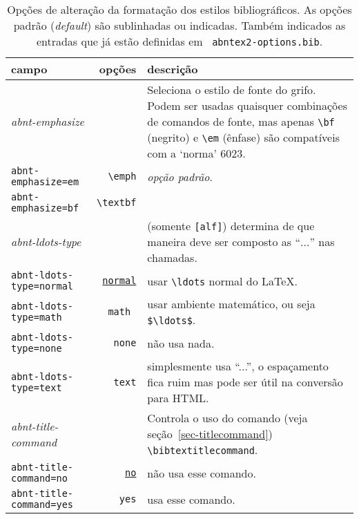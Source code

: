 \documentclass[a4paper]{ltxdoc}
\begin{document}
\begin{table}[htbp]

\caption[Opções de alteração dos estilos bibliográficos: formatação]{
Opções de alteração da formatação dos estilos bibliográficos.
As opções padrão (\emph{default}) são sublinhadas ou indicadas.
Também indicados as entradas que já estão definidas em {\tt
abntex2-options.bib}.}
\label{tabela-opcoes-formatacao}

\begin{center}
\begin{tabular}{lrp{8cm}}\hline\hline
campo & opções & descrição \\ \hline
\emph{abnt-emphasize} & & Seleciona o estilo de fonte do grifo.
Podem ser usadas quaisquer combinações de comandos de fonte, mas apenas
\verb+\bf+ (negrito) e \verb+\em+ (ênfase) são compatíveis com a `norma' 6023.
\\
{\tt abnt-emphasize=em} & \verb+\emph+ & {\em opção padrão}.  \\
{\tt abnt-emphasize=bf} & \verb+\textbf+ &
\\ \hline
\emph{abnt-ldots-type} && (somente {\tt [alf]}) determina de que maneira deve
ser composto as ``$\ldots$'' nas chamadas. \\
{\tt abnt-ldots-type=normal} & \underline{\tt normal} & usar \verb+\ldots+ normal do \LaTeX.\\
{\tt abnt-ldots-type=math} & \tt math & usar ambiente matemático, ou seja
\verb+$\ldots$+.\\
{\tt abnt-ldots-type=none} & {\tt none} & não usa nada.\\
{\tt abnt-ldots-type=text} & {\tt text} & simplesmente usa ``...'', o espaçamento
fica ruim mas pode ser útil na conversão para HTML.
\\ \hline
\emph{abnt-title-command} && Controla o uso do comando (veja
seção~\ref{sec-titlecommand}) \verb+\bibtextitlecommand+. \\
{\tt abnt-title-command=no} & \underline{\tt no} & não usa esse comando.\\
{\tt abnt-title-command=yes} & {\tt yes} & usa esse comando.
\\ \hline\hline
\end{tabular}
\end{center}
\end{table}
\end{document}
